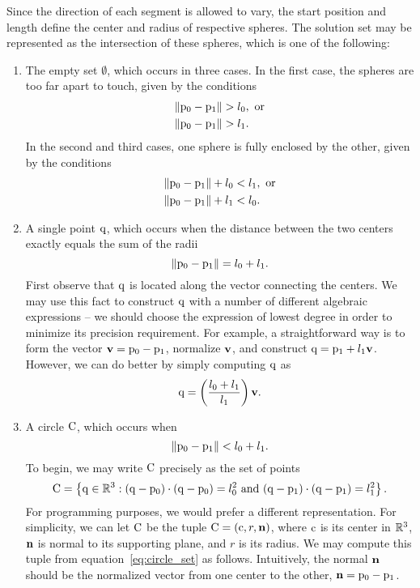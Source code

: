 \documentclass[oneside]{memoir}
\begin{document}
Since the direction of each segment is allowed to vary, the start position and
length define the center and radius of respective spheres. The solution set may
be represented as the intersection of these spheres, which is one of the
following:
\begin{enumerate}
  \item The empty set $\emptyset$, which occurs in three cases. In the first
  case, the spheres are too far apart to touch, given by the conditions
  \begin{align} 
  \|\mathrm{p_0}-\mathrm{p_1}\| &> l_0,\text{ or} \\
  \|\mathrm{p_0}-\mathrm{p_1}\| &> l_1. 
  \end{align}
  In the second and third cases, one sphere is fully enclosed by the other,
  given by the conditions 
  \begin{align}
  \|\mathrm{p_0}-\mathrm{p_1}\| + l_0 &< l_1,\text{ or} \\
  \|\mathrm{p_0}-\mathrm{p_1}\| + l_1 &< l_0.
  \end{align}
  \item A single point $\mathrm{q}$, which occurs when the distance between the two
  centers exactly equals the sum of the radii
  \begin{equation}
  \|\mathrm{p_0}-\mathrm{p_1}\|=l_0+l_1. 
  \end{equation}
  First observe that $\mathrm{q}$ is located along the vector connecting the
  centers. We may use this fact to construct $\mathrm{q}$ with a number of
  different algebraic expressions -- we should choose the expression of
  lowest degree in order to minimize its precision requirement. For example, a
  straightforward way is to form the vector $\mathbf{v} = \mathrm{p_0}-\mathrm{p_1}$,
  normalize $\mathbf{v}$, and construct $\mathrm{q} = \mathrm{p_1}+l_1\mathbf{v}$. However,
  we can do better by simply computing $\mathrm{q}$ as
  \begin{equation}
  \mathrm{q} = \left(\frac{l_0+l_1}{l_1}\right)\mathbf{v}.
  \end{equation}
  \item A circle $\mathrm{C}$, which occurs when
  \begin{equation}
  \|\mathrm{p_0}-\mathrm{p_1}\|<l_0+l_1. 
  \end{equation}
  To begin, we may write $\mathrm{C}$ precisely as the set of points 
  \begin{equation}\label{eq:circle_set}
  \mathrm{C} = \left\{\mathrm{q} \in \mathbb{R}^{3} : (\mathrm{q} - \mathrm{p_0})\cdot(\mathrm{q} -
  \mathrm{p_0})= l_0^2\text{ and } (\mathrm{q} - \mathrm{p_1})\cdot(\mathrm{q} -
  \mathrm{p_1})= l_1^2\right\}.
  \end{equation}
  For programming purposes, we would prefer a different representation. For
  simplicity, we can let $\mathrm{C}$ be the tuple $\mathrm{C} = (\mathrm{c},
  r, \mathbf{n})$, where $\mathrm{c}$ is its center in $\mathbb{R}^{3}$, $\mathbf{n}$ is normal
  to its supporting plane, and $r$ is its radius. We may compute this tuple from
  equation~\eqref{eq:circle_set} as follows. Intuitively, the normal $\mathbf{n}$
  should be the normalized vector from one center to the other, $\mathbf{n} =
  \mathrm{p_0}-\mathrm{p_1}$. 
  

\end{enumerate}
\end{document}
